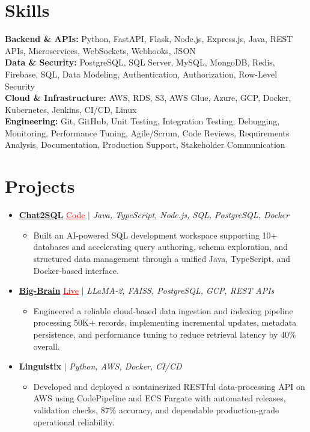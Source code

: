 \documentclass[letterpaper,10pt]{article}
\newcommand{\itemTail}{\vspace{-4pt}}
\newcommand{\sectionGap}{\vspace{-8pt}}
\newcommand{\projGap}{\vspace{3pt}}
\newcommand{\resumeItem}[1]{\item\small{{#1 \itemTail}}}
\newcommand{\resumeProjectHeading}[1]{\item \small #1 \vspace{-2pt}}
\newcommand{\resumeProjectLink}[2]{\href{#1}{\textcolor{red}{\underline{#2}}}}
\newcommand{\resumeSubHeadingListStart}{\begin{itemize}[leftmargin=0.0in, label={}]}
\newcommand{\resumeSubHeadingListEnd}{\end{itemize}}
\newcommand{\resumeProjItemListStart}{\begin{itemize}[leftmargin=0.15in,label=\textbullet,itemsep=3pt,topsep=0pt,parsep=0pt,partopsep=0pt]}
\newcommand{\resumeProjItemListEnd}{\end{itemize}\vspace{-4pt}}
\begin{document}
\section{Skills}
\begin{itemize}[leftmargin=0.15in, label={}]
\small{\item{
\textbf{Backend \& APIs:} Python, FastAPI, Flask, Node.js, Express.js, Java, REST APIs, Microservices, WebSockets, Webhooks, JSON \\
\textbf{Data \& Security:} PostgreSQL, SQL Server, MySQL, MongoDB, Redis, Firebase, SQL, Data Modeling, Authentication, Authorization, Row-Level Security \\
\textbf{Cloud \& Infrastructure:} AWS, RDS, S3, AWS Glue, Azure, GCP, Docker, Kubernetes, Jenkins, CI/CD, Linux \\
\textbf{Engineering:} Git, GitHub, Unit Testing, Integration Testing, Debugging, Monitoring, Performance Tuning, Agile/Scrum, Code Reviews, Requirements Analysis, Documentation, Production Support, Stakeholder Communication
}}
\end{itemize}
\sectionGap
\section{Projects}
\resumeSubHeadingListStart
\vspace{-2pt}
\resumeProjectHeading{\href{https://github.com/SAHAJ-BHADJA/Chat2SQL}{\textbf{Chat2SQL}} \resumeProjectLink{https://github.com/SAHAJ-BHADJA/Chat2SQL}{Code} $|$ \emph{Java, TypeScript, Node.js, SQL, PostgreSQL, Docker}}
\resumeProjItemListStart
\resumeItem{Built an AI-powered SQL development workspace supporting 10+ databases and accelerating query authoring, schema exploration, and structured data management through a unified Java, TypeScript, and Docker-based interface.}
\resumeProjItemListEnd
\projGap
\resumeProjectHeading{\href{https://big-brain-pied.vercel.app/}{\textbf{Big-Brain}} \resumeProjectLink{https://big-brain-pied.vercel.app/}{Live} $|$ \emph{LLaMA-2, FAISS, PostgreSQL, GCP, REST APIs}}
\resumeProjItemListStart
\resumeItem{Engineered a reliable cloud-based data ingestion and indexing pipeline processing 50K+ records, implementing incremental updates, metadata persistence, and performance tuning to reduce retrieval latency by 40\% overall.}
\resumeProjItemListEnd
\projGap
\resumeProjectHeading{\textbf{Linguistix} $|$ \emph{Python, AWS, Docker, CI/CD}}
\resumeProjItemListStart
\resumeItem{Developed and deployed a containerized RESTful data-processing API on AWS using CodePipeline and ECS Fargate with automated releases, validation checks, 87\% accuracy, and dependable production-grade operational reliability.}
\resumeProjItemListEnd
\resumeSubHeadingListEnd
\end{document}
